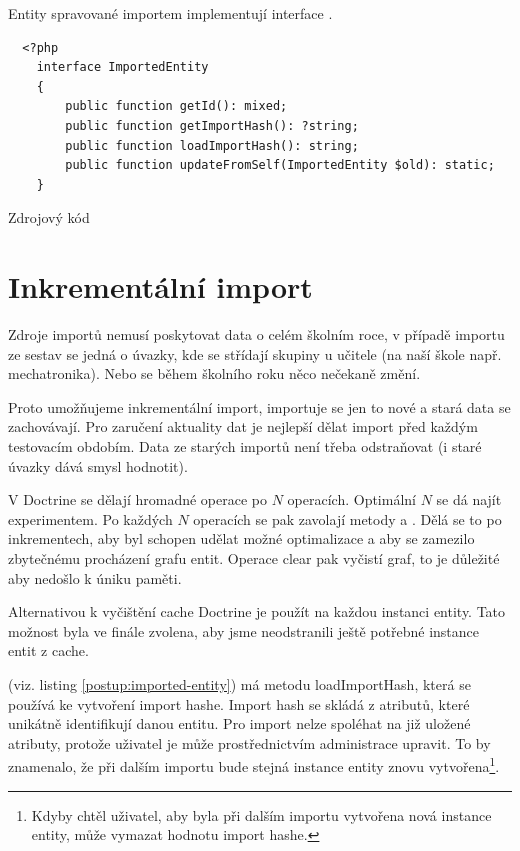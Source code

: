 Entity spravované importem implementují interface .

\begin{code}[H]
\begin{verbatim}
  <?php
    interface ImportedEntity
    {
        public function getId(): mixed;
        public function getImportHash(): ?string;   
        public function loadImportHash(): string;   
        public function updateFromSelf(ImportedEntity $old): static;
    }
\end{verbatim}
\caption{Zdrojový kód }
\label{postup:imported-entity}
\end{code}


\section{Inkrementální import}

Zdroje importů nemusí poskytovat data o celém školním roce, v případě importu ze sestav se jedná o úvazky, kde se střídají skupiny u učitele (na naší škole např. mechatronika).
 Nebo se během školního roku něco nečekaně změní.

Proto umožňujeme inkrementální import, importuje se jen to nové a stará data se zachovávají.
Pro zaručení aktuality dat je nejlepší dělat import před každým testovacím obdobím.
Data ze starých importů není třeba odstraňovat (i staré úvazky dává smysl hodnotit). 


V Doctrine se dělají hromadné operace po $N$ operacích. Optimální $N$ se dá najít experimentem.
Po každých $N$ operacích se pak zavolají metody  a .
Dělá se to po inkrementech, aby  byl schopen udělat možné optimalizace a aby se zamezilo zbytečnému procházení grafu entit. 
Operace clear pak vyčistí graf, to je důležité aby nedošlo k úniku paměti.

Alternativou k vyčištění cache Doctrine je použít  na každou instanci entity. Tato možnost byla ve finále zvolena, aby jsme neodstranili ještě potřebné instance entit z cache. 

 (viz. listing \ref{postup:imported-entity}) má metodu loadImportHash, která se používá ke vytvoření import hashe.
Import hash se skládá z atributů, které unikátně identifikují danou entitu.
Pro import nelze spoléhat na již uložené atributy, protože uživatel je může prostřednictvím administrace upravit.
To by znamenalo, že při dalším importu bude stejná instance entity znovu vytvořena\footnote{Kdyby chtěl uživatel, aby byla při dalším importu vytvořena nová instance entity, může vymazat hodnotu import hashe.}.


